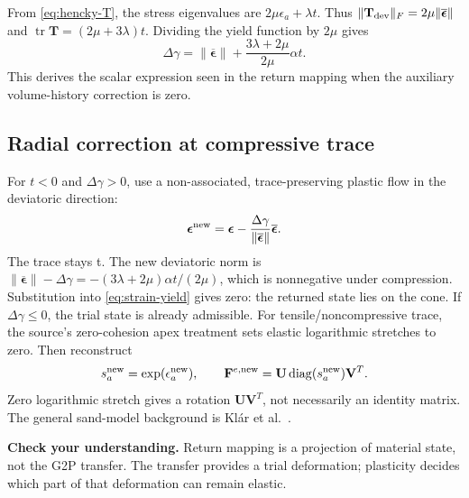 \documentclass[11pt,a4paper]{article}
\newcommand{\mat}[1]{\mathbf{#1}}
\newcommand{\checkpoint}[1]{\par\textbf{Check your understanding.} #1\par}
\DeclareMathOperator{\tr}{tr}
\DeclareMathOperator{\diag}{diag}
\numberwithin{equation}{section}
\begin{document}
From \eqref{eq:hencky-T}, the stress eigenvalues are $2\mu\epsilon_a+\lambda t$.
Thus $\|\mat T_{\rm dev}\|_F=2\mu\|\overline{\boldsymbol\epsilon}\|$ and
$\tr\mat T=(2\mu+3\lambda)t$. Dividing the yield function by $2\mu$ gives
\begin{equation}\label{eq:strain-yield}
\Delta\gamma=\|\overline{\boldsymbol\epsilon}\|
+\frac{3\lambda+2\mu}{2\mu}\alpha t.
\end{equation}
This derives the scalar expression seen in the return mapping when the
auxiliary volume-history correction is zero.

\subsection{Radial correction at compressive trace}
For $t<0$ and $\Delta\gamma>0$, use a non-associated, trace-preserving plastic
flow in the deviatoric direction:
\begin{equation}\label{eq:radial}
\boldsymbol\epsilon^{\rm new}
=\boldsymbol\epsilon-\frac{\Delta\gamma}
 {\|\overline{\boldsymbol\epsilon}\|}\overline{\boldsymbol\epsilon}.
\end{equation}
The trace stays t. The new deviatoric norm is
$\|\overline{\boldsymbol\epsilon}\|-\Delta\gamma
=-(3\lambda+2\mu)\alpha t/(2\mu)$, which is nonnegative under compression.
Substitution into \eqref{eq:strain-yield} gives zero: the returned state lies
on the cone. If $\Delta\gamma\le0$, the trial state is already admissible.
For tensile/noncompressive trace, the source's zero-cohesion apex treatment
sets elastic logarithmic stretches to zero. Then reconstruct
\[
s_a^{\rm new}=\exp(\epsilon_a^{\rm new}),\qquad
\mat F^{e,\rm new}=\mat U\diag(s_a^{\rm new})\mat V^T.
\]
Zero logarithmic stretch gives a rotation $\mat U\mat V^T$, not necessarily
an identity matrix. The general sand-model background is Kl\'ar et al.~\cite{sand}.
\checkpoint{Return mapping is a projection of material state, not the G2P
transfer. The transfer provides a trial deformation; plasticity decides which
part of that deformation can remain elastic.}
\end{document}
